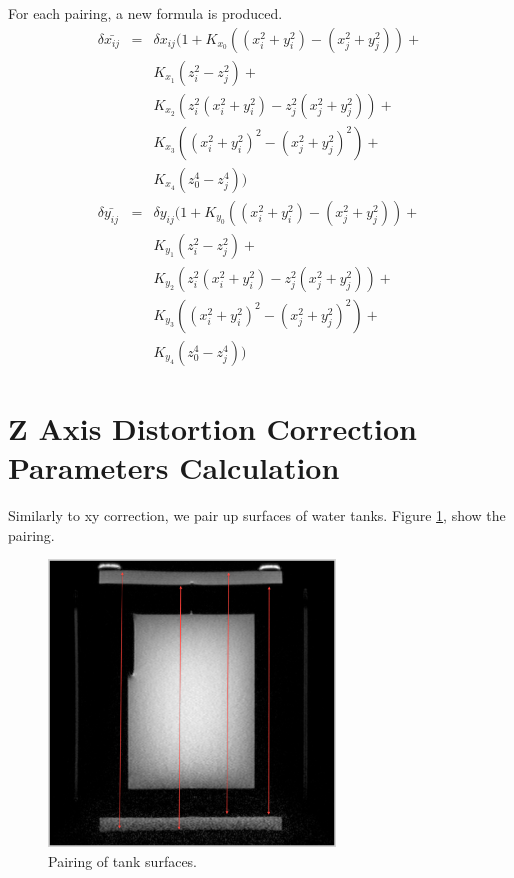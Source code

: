 For each pairing, a new formula is produced.
\begin{eqnarray} 
  \delta{\bar{x_{ij}}} & = & \delta{x_{ij}}(1 + K_{x_0}((x_i^2 + y_i^2) - (x_j^2 + y_j^2)) + \nonumber\\
  & & K_{x_1}(z_i^2 - z_j^2) + \nonumber\\
  & & K_{x_2}(z_i^2(x_i^2 + y_i^2)- z_j^2(x_j^2 + y_j^2)) + \nonumber\\
  & & K_{x_3}((x_i^2 + y_i^2)^2 - (x_j^2 + y_j^2)^2) + \nonumber\\
  & & K_{x_4}(z_0^4 - z_j^4)) \\
  \delta{\bar{y_{ij}}} & = & \delta{y_{ij}}(1 + K_{y_0}((x_i^2 + y_i^2) - (x_j^2 + y_j^2)) + \nonumber\\
  & & K_{y_1}(z_i^2 - z_j^2) + \nonumber\\
  & & K_{y_2}(z_i^2(x_i^2 + y_i^2)- z_j^2(x_j^2 + y_j^2)) + \nonumber\\
  & & K_{y_3}((x_i^2 + y_i^2)^2 - (x_j^2 + y_j^2)^2) + \nonumber\\
  & & K_{y_4}(z_0^4 - z_j^4))
\end{eqnarray}

\section{Z Axis Distortion Correction Parameters Calculation}

Similarly to xy correction, we pair up surfaces of water tanks. Figure \ref{fig:correction_surface_pairing}, 
show the pairing. \\

\begin{figure}[htb]
  \begin{center}
    \begin{minipage}[b]{3in}
      \centering
      \centerline{\mbox{\includegraphics[width=3in]{parameters/images/surface_pairing_z.eps}}}
    \end{minipage}
  \end{center}
  \caption{Pairing of tank surfaces. }
  \label{fig:correction_surface_pairing}
\end{figure}

